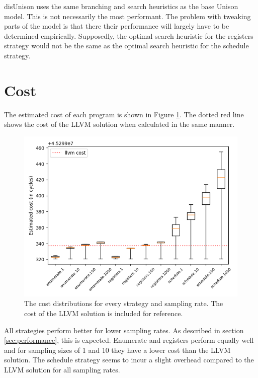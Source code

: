 disUnison uses the same branching and search heuristics as the base Unison model. This is
not necessarily the most performant. The problem with tweaking parts of the model is that
there their performance will largely have to be determined empirically. Supposedly, the
optimal search heuristic for the registers strategy would not be the same as the optimal
search heuristic for the schedule strategy.

\section{Cost}

The estimated cost of each program is shown in Figure \ref{fig:cost}. The dotted red line
shows the cost of the LLVM solution when calculated in the same manner.

\begin{figure}[h]
	\centering
	\includegraphics[width=\textwidth,height=0.5\textheight]{results/figures/cost}
	\caption{The cost distributions for every strategy and sampling rate. The cost of the LLVM solution is included for reference.}
	\label{fig:cost}
\end{figure}

All strategies perform better for lower sampling rates. As described in section
\ref{sec:performance}, this is expected. Enumerate and registers perform equally well and
for sampling sizes of 1 and 10 they have a lower cost than the LLVM solution. The schedule
strategy seems to incur a slight overhead compared to the LLVM solution for all sampling
rates.

\begin{table}[h]
		\centering
		\noindent\makebox[\textwidth]{%
			
		}
		\caption{The cost of the different sampling rates for the schedule strategy compared to the LLVM solution.%
		The difference column is the difference between the median cost of the sampling rate and the cost of the LLVM solution.}
		\label{table:sched_cost}
\end{table}

